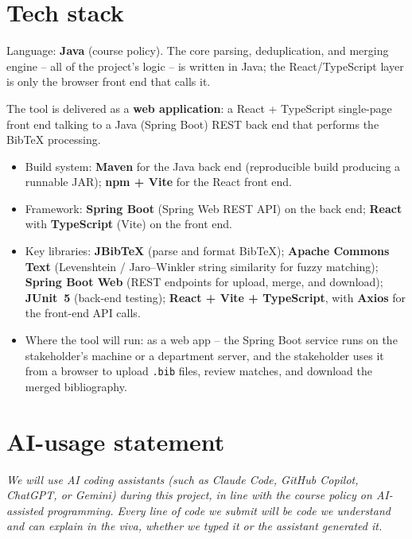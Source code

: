 \documentclass[11pt,a4paper]{article}
\begin{document}
\section{Tech stack}

Language: \textbf{Java} (course policy). The core parsing,
deduplication, and merging engine -- all of the project's logic -- is
written in Java; the React/TypeScript layer is only the browser front end
that calls it.

The tool is delivered as a \textbf{web application}: a React + TypeScript
single-page front end talking to a Java (Spring Boot) REST back end that
performs the BibTeX processing.

\begin{itemize}[nosep]
  \item Build system: \textbf{Maven} for the Java back end (reproducible
        build producing a runnable JAR); \textbf{npm + Vite} for the React
        front end.
  \item Framework: \textbf{Spring Boot} (Spring Web REST API) on the back
        end; \textbf{React} with \textbf{TypeScript} (Vite) on the front
        end.
  \item Key libraries:
        \textbf{JBibTeX} (parse and format BibTeX);
        \textbf{Apache Commons Text} (Levenshtein / Jaro--Winkler string
        similarity for fuzzy matching);
        \textbf{Spring Boot Web} (REST endpoints for upload, merge, and
        download);
        \textbf{JUnit~5} (back-end testing);
        \textbf{React + Vite + TypeScript}, with \textbf{Axios} for the
        front-end API calls.
  \item Where the tool will run: as a web app -- the Spring Boot service
        runs on the stakeholder's machine or a department server, and the
        stakeholder uses it from a browser to upload \texttt{.bib} files,
        review matches, and download the merged bibliography.
\end{itemize}

\section{AI-usage statement}

\textit{%
We will use AI coding assistants (such as Claude Code, GitHub Copilot,
ChatGPT, or Gemini) during this project, in line with the course
policy on AI-assisted programming.
Every line of code we submit will be code we understand and can
explain in the viva, whether we typed it or the assistant generated
it.%
}
\end{document}
